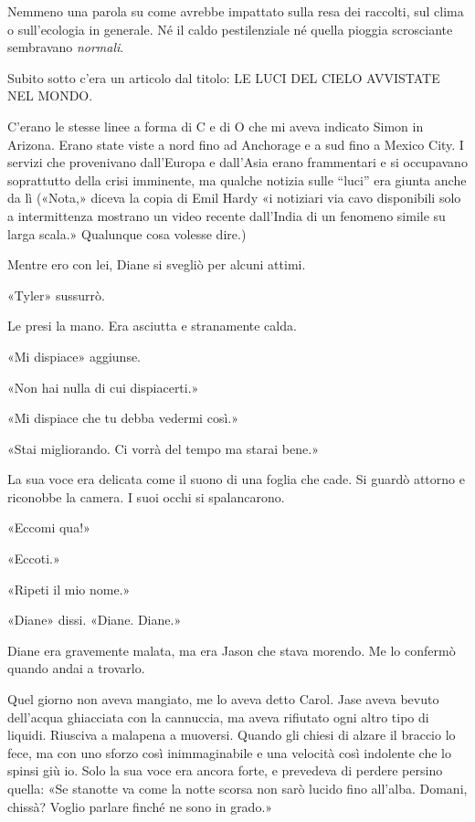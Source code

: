 Nemmeno una parola su come avrebbe impattato sulla resa dei raccolti,
sul clima o sull'ecologia in generale. Né il caldo pestilenziale né
quella pioggia scrosciante sembravano \emph{normali}.

Subito sotto c'era un articolo dal titolo: {LE LUCI DEL CIELO AVVISTATE
	NEL MONDO}.

C'erano le stesse linee a forma di C e di O che mi aveva indicato Simon
in Arizona. Erano state viste a nord fino ad Anchorage e a sud fino a
Mexico City. I servizi che provenivano dall'Europa e dall'Asia erano
frammentari e si occupavano soprattutto della crisi imminente, ma
qualche notizia sulle ``luci'' era giunta anche da lì («Nota,» diceva la
copia di Emil Hardy «i notiziari via cavo disponibili solo a
intermittenza mostrano un video recente dall'India di un fenomeno simile
su larga scala.» Qualunque cosa volesse dire.)

Mentre ero con lei, Diane si svegliò per alcuni attimi.

«Tyler» sussurrò.

Le presi la mano. Era asciutta e stranamente calda.

«Mi dispiace» aggiunse.

«Non hai nulla di cui dispiacerti.»

«Mi dispiace che tu debba vedermi così.»

«Stai migliorando. Ci vorrà del tempo ma starai bene.»

La sua voce era delicata come il suono di una foglia che cade. Si guardò
attorno e riconobbe la camera. I suoi occhi si spalancarono.

«Eccomi qua!»

«Eccoti.»

«Ripeti il mio nome.»

«Diane» dissi. «Diane. Diane.»

\separatorefiori

Diane era gravemente malata, ma era Jason che stava morendo. Me lo
confermò quando andai a trovarlo.

Quel giorno non aveva mangiato, me lo aveva detto Carol. Jase aveva
bevuto dell'acqua ghiacciata con la cannuccia, ma aveva rifiutato ogni
altro tipo di liquidi. Riusciva a malapena a muoversi. Quando gli chiesi
di alzare il braccio lo fece, ma con uno sforzo così inimmaginabile e
una velocità così indolente che lo spinsi giù io. Solo la sua voce era
ancora forte, e prevedeva di perdere persino quella: «Se stanotte va
come la notte scorsa non sarò lucido fino all'alba. Domani, chissà?
Voglio parlare finché ne sono in grado.»

